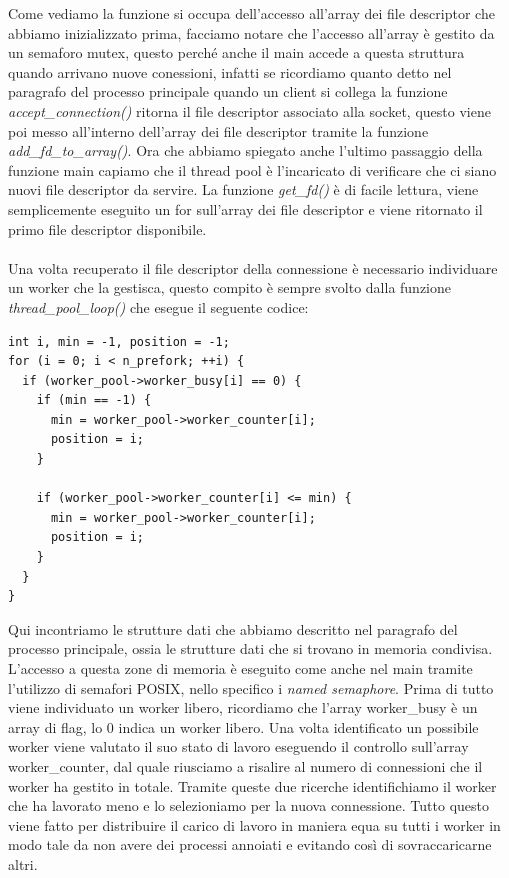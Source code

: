 \documentclass[italian]{tktltiki2}
\begin{document}
Come vediamo la funzione si occupa dell'accesso all'array dei file descriptor che abbiamo inizializzato prima, facciamo notare che l'accesso all'array è gestito da un semaforo mutex, questo perché anche il main accede a questa struttura quando arrivano nuove conessioni, infatti se ricordiamo quanto detto nel paragrafo del processo principale quando un client si collega la funzione \emph{accept\_connection()} ritorna il file descriptor associato alla socket, questo viene poi messo all'interno dell'array dei file descriptor tramite la funzione \emph{add\_fd\_to\_array()}. Ora che abbiamo spiegato anche l'ultimo passaggio della funzione main capiamo che il thread pool è l'incaricato di verificare che ci siano nuovi file descriptor da servire. La funzione \emph{get\_fd()} è di facile lettura, viene semplicemente eseguito un for sull'array dei file descriptor e viene ritornato il primo file descriptor disponibile.
\\
\\
Una volta recuperato il file descriptor della connessione è necessario individuare un worker che la gestisca, questo compito è sempre svolto dalla funzione \emph{thread\_pool\_loop()} che esegue il seguente codice:
\begin{lstlisting}
int i, min = -1, position = -1;
for (i = 0; i < n_prefork; ++i) {
  if (worker_pool->worker_busy[i] == 0) {
    if (min == -1) {
      min = worker_pool->worker_counter[i];
      position = i;
    }

    if (worker_pool->worker_counter[i] <= min) {
      min = worker_pool->worker_counter[i];
      position = i;
    }
  }
}
\end{lstlisting}
Qui incontriamo le strutture dati che abbiamo descritto nel paragrafo del processo principale, ossia le strutture dati che si trovano in memoria condivisa. L'accesso a questa zone di memoria è eseguito come anche nel main tramite l'utilizzo di semafori POSIX, nello specifico i \emph{named semaphore}. Prima di tutto viene individuato un worker libero, ricordiamo che l'array worker\_busy è un array di flag, lo 0 indica un worker libero. Una volta identificato un possibile worker viene valutato il suo stato di lavoro eseguendo il controllo sull'array worker\_counter, dal quale riusciamo a risalire al numero di connessioni che il worker ha gestito in totale. Tramite queste due ricerche identifichiamo il worker che ha lavorato meno e lo selezioniamo per la nuova connessione. Tutto questo viene fatto per distribuire il carico di lavoro in maniera equa su tutti i worker in modo tale da non avere dei processi annoiati e evitando così di sovraccaricarne altri.
\end{document}
